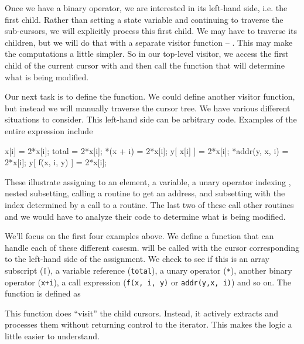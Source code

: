 Once we have a binary operator, we are interested in its left-hand
side, i.e. the first child.  Rather than setting a state variable and
continuing to traverse the sub-cursors, we will explicitly process
this first child. We may have to traverse its children, but we will do
that with a separate visitor function -- .  This may
make the computations a little simpler.  So in our top-level visitor,
we access the first child of the current cursor with 
and  then call the function that will determine what is being modified.

Our next task is to define the  function.  We could
define another visitor function, but instead we will manually traverse
the cursor tree.  We have various different situations to consider.
This left-hand side can be arbitrary \C{} code. Examples of the entire
expression include
\begin{CCode}
x[i] = 2*x[i];
total = 2*x[i];
*(x + i) = 2*x[i];  
y[ x[i] ] = 2*x[i];
*addr(y, x, i) = 2*x[i];
y[ f(x, i, y) ] = 2*x[i];
\end{CCode}
These illustrate assigning to an element, a variable,
a unary operator indexing , nested subsetting, 
calling a routine to get an address, and subsetting
with the index determined by a call to a routine.
The last two of these call other routines and we would have
to analyze their code to determine what is being modified.

We'll focus on the first four examples above.  We define a function
that can handle each of these different casesm.  
will be called with the cursor corresponding to the left-hand side of
the assignment.  We check to see if this is an array subscript
(\verb+[+), a variable reference (\verb+total+), a unary operator
(\verb+*+), another binary operator (\verb|x+i|), a call expression
(\verb+f(x, i, y)+ or \verb+addr(y,x, i)+) and so on.
The function is defined as
This function does ``visit'' the child cursors. Instead, it actively
extracts and processes them without returning control to the
\libclang{} iterator. This makes the logic a little easier to
understand.


